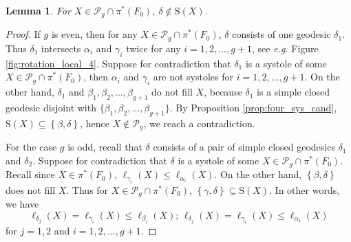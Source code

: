 \documentclass[UTF8]{amsart}
\newtheorem{lemma}[theorem]{Lemma}
\numberwithin{equation}{section}
\theoremstyle{definition}
\theoremstyle{example}
\theoremstyle{remark}
\begin{document}
\begin{lemma}
 For $X \in \mathcal{P}_g \cap \pi^{*}(F_0)$, $\delta \notin \mathrm{S}(X)$. 
 \label{lem:delta_not}
\end{lemma}
\begin{proof}
 If $g$ is even, then for any $X \in \mathcal{P}_g \cap \pi^{*}(F_0)$, $\delta$ consists of one geodesic $\delta_1$. Thus $\delta_1$ intersects $\alpha_i$ and $\gamma_i$ twice for any $i= 1,2,...,g+1$, see \emph{e.g.} Figure \ref{fig:rotation_local_4}. 
 Suppose for contradiction that $\delta_1$ is a systole of some $X \in \mathcal{P}_g \cap \pi^{*}(F_0)$, then $\alpha_i$ and $\gamma_i$ are not systoles for $i=1,2,...,g+1$. On the other hand, $\delta_1$ and $\beta_1, \beta_2, ..., \beta_{g+1}$ do not fill $X$, because $\delta_1$ is a simple closed geodesic disjoint with $\{\beta_1, \beta_2, ..., \beta_{g+1}\}$. By Proposition \ref{prop:four_sys_cand}, $\mathrm{S}(X) \subseteq \left\{ \beta, \delta \right\} $, hence $X\notin \mathcal{P}_g$, we reach a contradiction. 

 For the case $g$ is odd, recall that $\delta$ consists of a pair of simple closed geodesics $\delta_1$ and $\delta_2$. Suppose for contradiction that $\delta$ is a systole of some $X \in \mathcal{P}_g \cap \pi^{*}(F_0)$. 
Recall since $X \in \pi^{*}(F_0)$, $\ell_{\gamma_i}(X) \le \ell_{\alpha_i}(X)$. On the other hand, $\left\{ \beta, \delta \right\} $ does not fill $X$. Thus for $X \in \mathcal{P}_g\cap \pi^{*}(F_0)$, $\left\{ \gamma, \delta  \right\} \subseteq \mathrm{S}(X)$. In other words, we have
\begin{equation}
  \ell_{\delta_j}(X) = \ell_{\gamma_i}(X) \le \ell_{\beta_i}(X) ;\, \ell_{\delta_j}(X) = \ell_{\gamma_i}(X) \le \ell_{\alpha_i}(X)
  \label{for:condition}
\end{equation}
 for $j=1,2$ and $i=1,2,...,g+1$. 


\end{proof}
\end{document}

